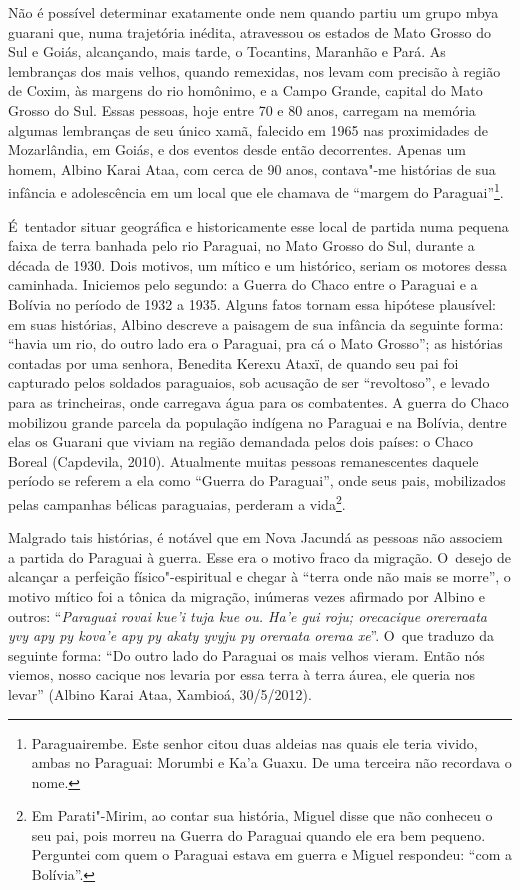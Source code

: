 Não é possível determinar exatamente onde nem quando partiu um grupo
mbya guarani que, numa trajetória inédita, atravessou os estados de
Mato Grosso do Sul e Goiás, alcançando, mais tarde, o Tocantins,
Maranhão e Pará. As lembranças dos mais velhos, quando remexidas, nos
levam com precisão à região de Coxim, às margens do rio homônimo, e a
Campo Grande, capital do Mato Grosso do Sul. Essas pessoas, hoje entre
70 e 80 anos, carregam na memória algumas lembranças de seu único xamã,
falecido em 1965 nas proximidades de Mozarlândia, em Goiás, e
dos eventos desde então decorrentes. Apenas um homem, Albino Karai
Ataa, com cerca de 90 anos, contava"-me histórias de sua
infância e adolescência em um local que ele chamava de ``margem do
Paraguai''\footnote{Paraguairembe. Este senhor citou duas aldeias nas
quais ele teria vivido, ambas no Paraguai: Morumbi e Ka’a Guaxu. De uma
terceira não recordava o nome.}. 

É~tentador situar geográfica e historicamente esse local de partida numa
pequena faixa de terra banhada pelo rio Paraguai, no Mato Grosso do
Sul, durante a década de 1930. Dois motivos, um mítico e um histórico,
seriam os motores dessa caminhada. Iniciemos pelo segundo: a Guerra do
Chaco entre o Paraguai e a Bolívia no período de 1932 a 1935. Alguns
fatos tornam essa hipótese plausível: em suas histórias, Albino
descreve a paisagem de sua infância da seguinte forma: ``havia um rio,
do outro lado era o Paraguai, pra cá o Mato Grosso''; as histórias
contadas por uma senhora, Benedita Kerexu Ataxï, de quando seu pai foi
capturado pelos soldados paraguaios, sob acusação de ser ``revoltoso'', e
levado para as trincheiras, onde carregava água para os combatentes. A
guerra do Chaco mobilizou grande parcela da população indígena no
Paraguai e na Bolívia, dentre elas os Guarani que viviam na região
demandada pelos dois países: o Chaco Boreal (Capdevila, 2010).
Atualmente muitas pessoas remanescentes daquele período se referem a
ela como ``Guerra do Paraguai'', onde seus pais, mobilizados pelas
campanhas bélicas paraguaias, perderam a vida\footnote{Em Parati"-Mirim,
ao contar sua história, Miguel disse que não conheceu o seu pai, pois
morreu na Guerra do Paraguai quando ele era bem pequeno. Perguntei com
quem o Paraguai estava em guerra e Miguel respondeu: ``com a Bolívia''.}.

Malgrado tais histórias, é notável que em Nova Jacundá as pessoas não
associem a partida do Paraguai à guerra. Esse era o motivo fraco da
migração. O~desejo de alcançar a perfeição físico"-espiritual e chegar à
``terra onde não mais se morre'', o motivo mítico foi a tônica da
migração, inúmeras vezes afirmado por Albino e outros: ``\emph{Paraguai rovai
kue’i tuja kue ou. Ha’e gui roju; orecacique orereraata yvy apy py
kova’e apy py akaty yvyju py oreraata oreraa xe}''. O~que traduzo da
seguinte forma: ``Do outro lado do Paraguai os mais velhos vieram. Então
nós viemos, nosso cacique nos levaria por essa terra à terra áurea, ele
queria nos levar'' (Albino Karai Ataa,  Xambioá, 30/5/2012).

